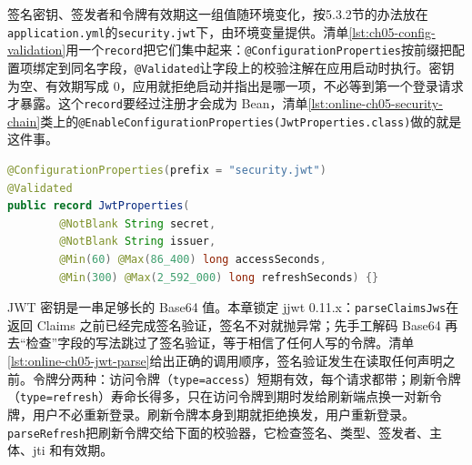 签名密钥、签发者和令牌有效期这一组值随环境变化，按5.3.2节的办法放在\texttt{application.yml}的\texttt{security.jwt}下，由环境变量提供。清单\ref{lst:ch05-config-validation}用一个\texttt{record}把它们集中起来：\texttt{@ConfigurationProperties}按前缀把配置项绑定到同名字段，\texttt{@Validated}让字段上的校验注解在应用启动时执行。密钥为空、有效期写成 0，应用就拒绝启动并指出是哪一项，不必等到第一个登录请求才暴露。这个\texttt{record}要经过注册才会成为 Bean，清单\ref{lst:online-ch05-security-chain}类上的\texttt{@EnableConfigurationProperties(JwtProperties.class)}做的就是这件事。

\begin{lstlisting}[label={lst:ch05-config-validation},language=Java,caption={JwtProperties：集中绑定 JWT 配置并在启动时校验}]
@ConfigurationProperties(prefix = "security.jwt")
@Validated
public record JwtProperties(
        @NotBlank String secret,
        @NotBlank String issuer,
        @Min(60) @Max(86_400) long accessSeconds,
        @Min(300) @Max(2_592_000) long refreshSeconds) {}
\end{lstlisting}

JWT 密钥是一串足够长的 Base64 值。本章锁定 jjwt 0.11.x：\texttt{parseClaimsJws}在返回 Claims 之前已经完成签名验证，签名不对就抛异常；先手工解码 Base64 再去“检查”字段的写法跳过了签名验证，等于相信了任何人写的令牌。清单\ref{lst:online-ch05-jwt-parse}给出正确的调用顺序，签名验证发生在读取任何声明之前。令牌分两种：访问令牌（\texttt{type=access}）短期有效，每个请求都带；刷新令牌（\texttt{type=refresh}）寿命长得多，只在访问令牌到期时发给刷新端点换一对新令牌，用户不必重新登录。刷新令牌本身到期就拒绝换发，用户重新登录。\texttt{parseRefresh}把刷新令牌交给下面的校验器，它检查签名、类型、签发者、主体、jti 和有效期。

